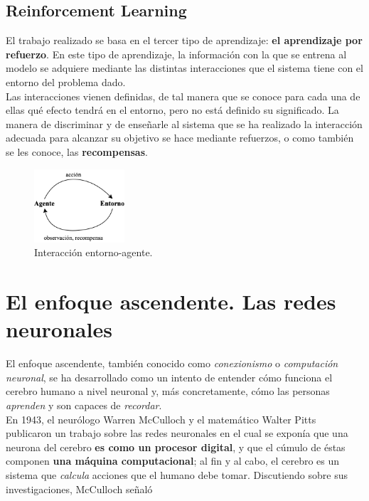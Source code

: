 \subsection{Reinforcement Learning}

El trabajo realizado se basa en el tercer tipo de aprendizaje: \textbf{el aprendizaje por refuerzo}. En este tipo de aprendizaje, la información con la que se entrena al modelo se adquiere mediante las distintas interacciones que el sistema tiene con el entorno del problema dado. \\

Las interacciones vienen definidas, de tal manera que se conoce para cada una de ellas qué efecto tendrá en el entorno, pero no está definido su significado. La manera de discriminar y de enseñarle al sistema que se ha realizado la interacción adecuada para alcanzar su objetivo se hace mediante refuerzos, o como también se les conoce, las \textbf{recompensas}. 

\begin{figure}[h]
    \centering
    \includegraphics[width=0.3\textwidth]{cap2_contextualizacion/images/gym_ML.png}
    \caption{Interacción entorno-agente.}
    \label{fig:gym_ML}
\end{figure}


\section{El enfoque ascendente. Las redes neuronales}

El enfoque ascendente, también conocido como \textit{conexionismo} o \textit{computación neuronal}, se ha desarrollado como un intento de entender cómo funciona el cerebro humano a nivel neuronal y, más concretamente, cómo las personas \textit{aprenden} y son capaces de \textit{recordar}. \\

En 1943, el neurólogo Warren McCulloch y el matemático Walter Pitts publicaron un trabajo \cite{mcculloch1943logical} sobre las redes neuronales en el cual se exponía que una neurona del cerebro \textbf{es como un procesor digital}, y que el cúmulo de éstas componen \textbf{una máquina computacional}; al fin y al cabo, el cerebro es un sistema que \textit{calcula} acciones que el humano debe tomar. Discutiendo sobre sus investigaciones, McCulloch señaló

